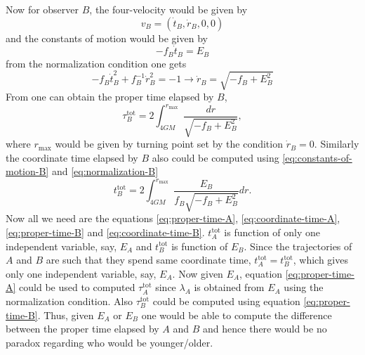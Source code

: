 \documentclass{article}
\begin{document}
\begin{enumerate}
  Now for observer $B$, the four-velocity would be given by
  \begin{equation}
    \label{eq:four-velocity-B}
    v_B = (\dot{t}_B, \dot{r}_B, 0, 0)
  \end{equation}
  and the constants of motion would be given by
  \begin{equation}
    \label{eq:constants-of-motion-B}
    -f_B\dot{t}_B = E_B
  \end{equation}
  from the normalization condition one gets
  \begin{equation}
    \label{eq:normalization-B}
    -f_B\dot{t}_B^2 + f^{-1}_B \dot{r}_B^2 = -1 \to \dot{r}_B = \sqrt{-f_B + E_B^2}
  \end{equation}
  From one can obtain the proper time elapsed by $B$,
  \begin{equation}
    \label{eq:proper-time-B}
    \tau_B^\text{tot} = 2\int_{4GM}^{r_{\text{max}}}\frac{dr}{\sqrt{-f_B + E_B^2}},
  \end{equation}
  where $r_\text{max}$ would be given by turning point set by the condition $\dot{r}_B = 0$. Similarly the coordinate time elapsed by $B$ also could be computed using \eqref{eq:constants-of-motion-B} and \eqref{eq:normalization-B}
  \begin{equation}
    \label{eq:coordinate-time-B}
    t_B^{\text{tot}} = 2 \int_{4GM}^{r_{\text{max}}}\frac{E_B}{f_B\sqrt{-f_B + E_B^2}}dr.
  \end{equation}
  Now all we need are the equations \eqref{eq:proper-time-A}, \eqref{eq:coordinate-time-A}, \eqref{eq:proper-time-B} and \eqref{eq:coordinate-time-B}. $t_A^{\text{tot}}$ is function of only one independent variable, say, $E_A$ and $t^\text{tot}_B$ is function of $E_B$. Since the trajectories of $A$ and $B$ are such that they spend same coordinate time, $t^\text{tot}_A = t^\text{tot}_B$, which gives only one independent variable, say, $E_A$. Now given $E_A$, equation \eqref{eq:proper-time-A} could be used to computed $\tau_A^{\text{tot}}$ since $\lambda_A$ is obtained from $E_A$ using the normalization condition. Also $\tau_B^{\text{tot}}$ could be computed using equation \eqref{eq:proper-time-B}. Thus, given $E_A$ or $E_B$ one would be able to compute the difference between the proper time elapsed by $A$ and $B$ and hence there would be no paradox regarding who would be younger/older.

\end{enumerate}
\end{document}
